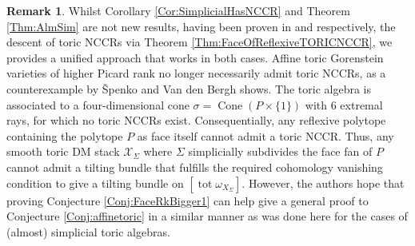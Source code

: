 \documentclass[reqno, 12pt]{amsart}
\theoremstyle{definition}
\newtheorem{remark}[theorem]{Remark}
\numberwithin{equation}{section}
\newcommand{\tot}{\operatorname{tot}}
\newcommand{\cone}{\operatorname{Cone}}
\begin{document}
\begin{remark}
    Whilst Corollary \ref{Cor:SimplicialHasNCCR} and Theorem \ref{Thm:AlmSim} are not new results, having been proven in \cite{FMS19} and \cite{Tomo25} respectively, the descent of toric NCCRs via Theorem \ref{Thm:FaceOfReflexiveTORICNCCR}, we provides a unified approach that works in both cases. 
    Affine toric Gorenstein varieties of higher Picard rank no longer necessarily admit toric NCCRs, as a counterexample by  \v{S}penko and Van den Bergh \cite[Example 6.1]{SVdBtoricI} shows. The toric algebra is associated to a four-dimensional cone $\sigma=\cone(P\times\{1\})$ with 6 extremal rays, for which no toric NCCRs exist. Consequentially, any reflexive polytope containing the polytope $P$ as face itself cannot admit a toric NCCR. Thus, any smooth toric DM stack $\mathcal{X}_\Sigma$ where $\Sigma$ simplicially subdivides the face fan of $P$ cannot admit a tilting bundle that fulfills the required cohomology vanishing condition to give a tilting bundle on $[\tot\omega_{X_\Sigma}]$. However, the authors hope that proving Conjecture \ref{Conj:FaceRkBigger1} can help give a general proof to Conjecture \ref{Conj:affinetoric} in a similar manner as was done here for the cases of (almost) simplicial toric algebras.
\end{remark}





\end{document}
